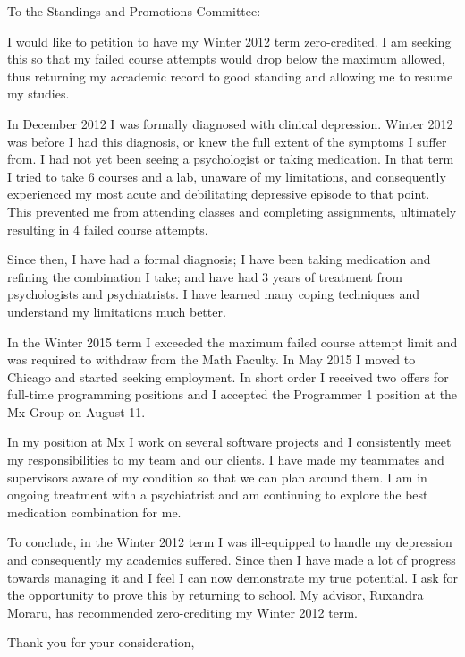 \documentclass{letter}
\begin{document}
\begin{letter}{}
    \opening{To the Standings and Promotions Committee:}
    I would like to petition to have my Winter 2012 term zero-credited.
    I am seeking this so that my failed course attempts would drop below the maximum allowed,
    thus returning my accademic record to good standing and allowing me to resume my studies.

    In December 2012 I was formally diagnosed with clinical depression.
    Winter 2012 was before I had this diagnosis,
    or knew the full extent of the symptoms I suffer from.
    I had not yet been seeing a psychologist or taking medication.
    In that term I tried to take 6 courses and a lab, unaware of my limitations,
    and consequently experienced my most acute and debilitating depressive episode to that point.
    This prevented me from attending classes and completing assignments,
    ultimately resulting in 4 failed course attempts.

    Since then, I have had a formal diagnosis;
    I have been taking medication and refining the combination I take;
    and have had 3 years of treatment from psychologists and psychiatrists.
    I have learned many coping techniques and understand my limitations much better.

    In the Winter 2015 term I exceeded the maximum failed course attempt limit
    and was required to withdraw from the Math Faculty.
    In May 2015 I moved to Chicago and started seeking employment.
    In short order I received two offers for full-time programming positions
    and I accepted the Programmer 1 position at the Mx Group on August 11.

    In my position at Mx I work on several software projects and
    I consistently meet my responsibilities to my team and our clients.
    I have made my teammates and supervisors aware of my condition
    so that we can plan around them.
    I am in ongoing treatment with a psychiatrist and am continuing to explore
    the best medication combination for me.

    To conclude, in the Winter 2012 term I was ill-equipped to handle my depression
    and consequently my academics suffered.
    Since then I have made a lot of progress towards managing it
    and I feel I can now demonstrate my true potential.
    I ask for the opportunity to prove this by returning to school.
    My advisor, Ruxandra Moraru, has recommended zero-crediting my Winter 2012 term.

    \closing{Thank you for your consideration,}
\end{letter}
\end{document}
